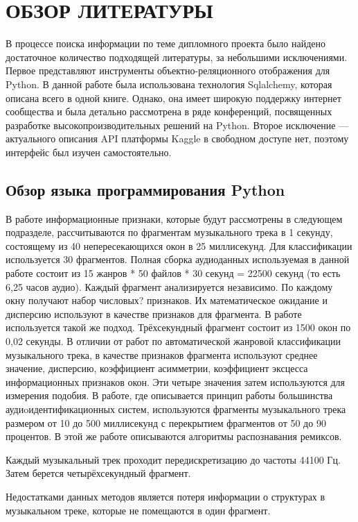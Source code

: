 \section{ОБЗОР ЛИТЕРАТУРЫ}
\label{sec:domain}
В процессе поиска информации по теме дипломного проекта было найдено достаточное количество подходящей литературы, за небольшими исключениями. Первое представляют инструменты объектно-реляционного отображения для Python. В данной работе была использована технология Sqlalchemy, которая описана всего в одной книге. Однако, она имеет широкую поддержку интернет сообщества и была детально рассмотрена в ряде конференций, посвященных разработке высокопроизводительных решений на Python. Второе исключение --- актуального описания API платформы Kaggle в свободном доступе нет, поэтому интерфейс был изучен самостоятельно.
\subsection{Обзор языка программирования Python}
\label{sub:domain:overview_framing}
В работе\cite{src1}  информационные признаки, которые будут рассмотрены в следующем подразделе,  рассчитываются по фрагментам музыкального трека в 1 секунду, состоящему из 40 непересекающихся окон в  25 миллисекунд.  Для классификации используется 30 фрагментов. Полная сборка аудиоданных используемая в данной работе  состоит из 15 жанров * 50 файлов * 30 секунд = 22500 секунд (то есть 6,25 часов аудио). Каждый фрагмент  анализируется независимо. По каждому окну получают набор числовых? признаков. Их математическое ожидание и дисперсию используют в качестве признаков для фрагмента. В работе\cite{src2} используется такой же подход. Трёхсекундный фрагмент состоит из 1500 окон по 0,02 секунды. В отличии от работ\cite{src1} по автоматической жанровой классификации музыкального трека, в качестве признаков фрагмента используют  среднее значение, дисперсию, коэффициент асимметрии, коэффициент эксцесса информационных признаков окон. Эти четыре значения затем используются для измерения подобия. В работе\cite{src4}, где описывается принцип работы большинства аудиoидентификационных систем, используются фрагменты музыкального трека размером от 10 до 500 миллисекунд с перекрытием фрагментов от 50 до 90 процентов. В этой же работе описываются алгоритмы распознавания ремиксов. 

Каждый музыкальный трек проходит передискретизацию до частоты 44100 Гц. Затем берется  четырёхсекундный фрагмент.

Недостатками данных методов является потеря информации о структурах в музыкальном треке, которые не помещаются в один фрагмент.

